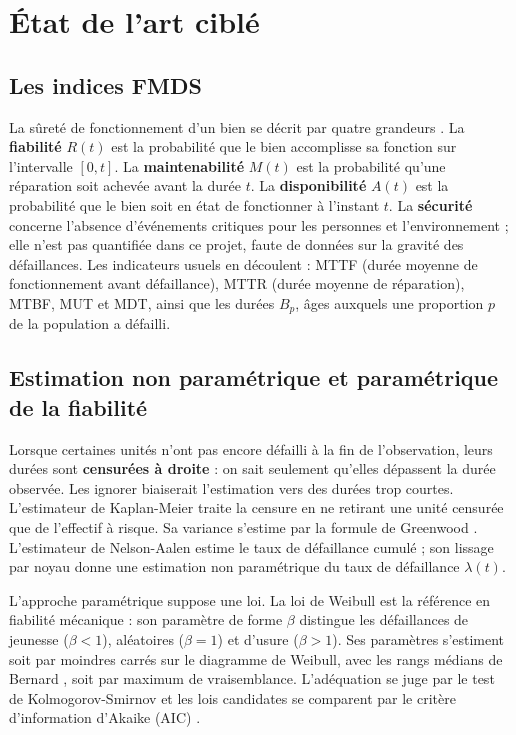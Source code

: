 \section{État de l'art ciblé}\label{sec:ea}

\subsection{Les indices FMDS}\label{sec:ea-fmds}

La sûreté de fonctionnement d'un bien se décrit par quatre grandeurs \cite{benhmida,nf13306}. La \textbf{fiabilité} $R(t)$ est la probabilité que le bien accomplisse sa fonction sur l'intervalle $[0, t]$. La \textbf{maintenabilité} $M(t)$ est la probabilité qu'une réparation soit achevée avant la durée $t$. La \textbf{disponibilité} $A(t)$ est la probabilité que le bien soit en état de fonctionner à l'instant $t$. La \textbf{sécurité} concerne l'absence d'événements critiques pour les personnes et l'environnement ; elle n'est pas quantifiée dans ce projet, faute de données sur la gravité des défaillances. Les indicateurs usuels en découlent : MTTF (durée moyenne de fonctionnement avant défaillance), MTTR (durée moyenne de réparation), MTBF, MUT et MDT, ainsi que les durées $B_p$, âges auxquels une proportion $p$ de la population a défailli.

\subsection{Estimation non paramétrique et paramétrique de la fiabilité}\label{sec:ea-estimation}

Lorsque certaines unités n'ont pas encore défailli à la fin de l'observation, leurs durées sont \textbf{censurées à droite} : on sait seulement qu'elles dépassent la durée observée. Les ignorer biaiserait l'estimation vers des durées trop courtes. L'estimateur de Kaplan-Meier \cite{kaplanmeier1958} traite la censure en ne retirant une unité censurée que de l'effectif à risque. Sa variance s'estime par la formule de Greenwood \cite{greenwood1926}. L'estimateur de Nelson-Aalen \cite{nelson1972,aalen1978} estime le taux de défaillance cumulé ; son lissage par noyau donne une estimation non paramétrique du taux de défaillance $\lambda(t)$.

L'approche paramétrique suppose une loi. La loi de Weibull \cite{weibull1951} est la référence en fiabilité mécanique : son paramètre de forme $\beta$ distingue les défaillances de jeunesse ($\beta < 1$), aléatoires ($\beta = 1$) et d'usure ($\beta > 1$). Ses paramètres s'estiment soit par moindres carrés sur le diagramme de Weibull, avec les rangs médians de Bernard \cite{bernard1953}, soit par maximum de vraisemblance. L'adéquation se juge par le test de Kolmogorov-Smirnov \cite{massey1951} et les lois candidates se comparent par le critère d'information d'Akaike (AIC) \cite{akaike1974}.

